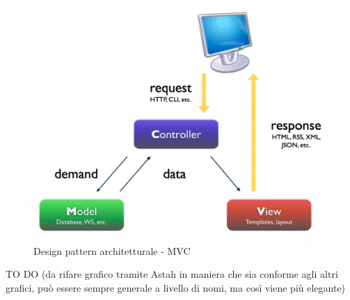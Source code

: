 		\begin{figure}[htbp]
			\centering
			\centerline{\includegraphics[scale=0.6]{./images/mvc.png}}
			\caption{Design pattern architetturale - MVC}
		\end{figure}
		TO DO (da rifare grafico tramite Astah in maniera che sia conforme agli altri grafici, può essere sempre generale a livello di nomi, ma così viene più elegante)


